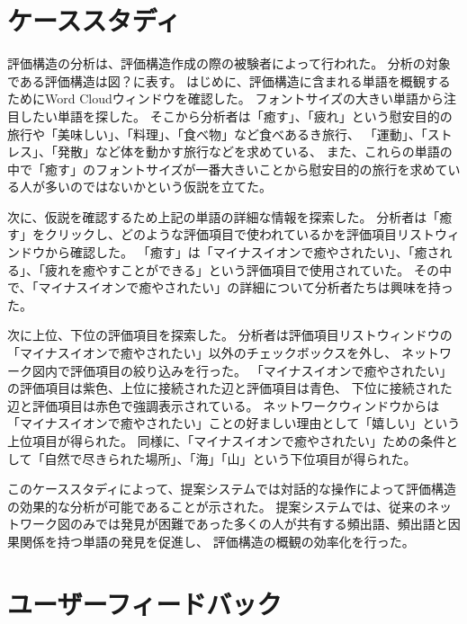 \documentclass[syuuron]{kuee}
\begin{document}
	\section{ケーススタディ}
	評価構造の分析は、評価構造作成の際の被験者によって行われた。
	分析の対象である評価構造は図？に表す。
	はじめに、評価構造に含まれる単語を概観するためにWord Cloudウィンドウを確認した。
	フォントサイズの大きい単語から注目したい単語を探した。
	そこから分析者は「癒す」、「疲れ」という慰安目的の旅行や「美味しい」、「料理」、「食べ物」など食べあるき旅行、
	「運動」、「ストレス」、「発散」など体を動かす旅行などを求めている、
	また、これらの単語の中で「癒す」のフォントサイズが一番大きいことから慰安目的の旅行を求めている人が多いのではないかという仮説を立てた。
	
	次に、仮説を確認するため上記の単語の詳細な情報を探索した。
	分析者は「癒す」をクリックし、どのような評価項目で使われているかを評価項目リストウィンドウから確認した。
	「癒す」は「マイナスイオンで癒やされたい」、「癒される」、「疲れを癒やすことができる」という評価項目で使用されていた。
	その中で、「マイナスイオンで癒やされたい」の詳細について分析者たちは興味を持った。
	
	次に上位、下位の評価項目を探索した。
	分析者は評価項目リストウィンドウの「マイナスイオンで癒やされたい」以外のチェックボックスを外し、
	ネットワーク図内で評価項目の絞り込みを行った。
	「マイナスイオンで癒やされたい」の評価項目は紫色、上位に接続された辺と評価項目は青色、
	下位に接続された辺と評価項目は赤色で強調表示されている。
	ネットワークウィンドウからは「マイナスイオンで癒やされたい」ことの好ましい理由として「嬉しい」という上位項目が得られた。
	同様に、「マイナスイオンで癒やされたい」ための条件として「自然で尽きられた場所」、「海」「山」という下位項目が得られた。
	
	このケーススタディによって、提案システムでは対話的な操作によって評価構造の効果的な分析が可能であることが示された。
	提案システムでは、従来のネットワーク図のみでは発見が困難であった多くの人が共有する頻出語、頻出語と因果関係を持つ単語の発見を促進し、
	評価構造の概観の効率化を行った。
	
	\section{ユーザーフィードバック}
\end{document}

